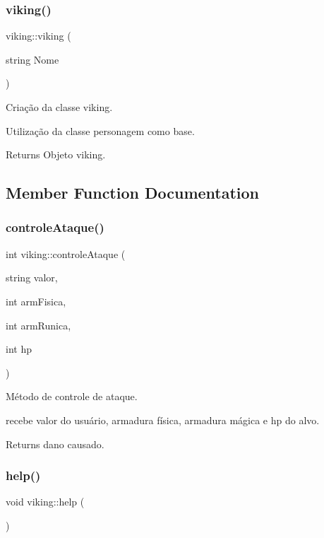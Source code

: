 \subsubsection{\texorpdfstring{viking()}{viking()}}
{\footnotesize\ttfamily viking\+::viking (\begin{DoxyParamCaption}\item[{string}]{Nome }\end{DoxyParamCaption})}



Criação da classe viking. 

Utilização da classe personagem como base. \begin{DoxyReturn}{Returns}
Objeto viking. 
\end{DoxyReturn}


\subsection{Member Function Documentation}
\mbox{\label{classviking_aba7bbd831d9b38d98b74ca805d2ea250}} 
\subsubsection{\texorpdfstring{controle\+Ataque()}{controleAtaque()}}
{\footnotesize\ttfamily int viking\+::controle\+Ataque (\begin{DoxyParamCaption}\item[{string}]{valor,  }\item[{int}]{arm\+Fisica,  }\item[{int}]{arm\+Runica,  }\item[{int}]{hp }\end{DoxyParamCaption})}



Método de controle de ataque. 

recebe valor do usuário, armadura física, armadura mágica e hp do alvo. \begin{DoxyReturn}{Returns}
dano causado. 
\end{DoxyReturn}
\mbox{\label{classviking_a486735595f8a0f86a075699bec76c03e}} 
\subsubsection{\texorpdfstring{help()}{help()}}
{\footnotesize\ttfamily void viking\+::help (\begin{DoxyParamCaption}{ }\end{DoxyParamCaption})}



